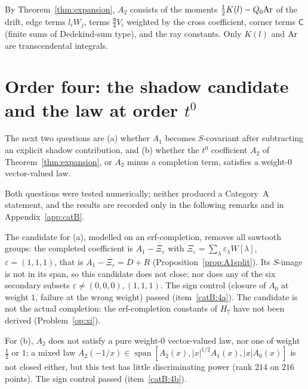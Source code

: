 \begin{remark}[Structure of $A_2$]
By Theorem~\ref{thm:expansion}, $A_2$ consists of the moments $\frac12K(l)-Q_0\mathrm{Ar}$ of the drift, edge terms $l_iW_j$, terms $\frac{\mathsf q}4V_i$ weighted by the
cross coefficient, corner terms $\mathsf C$ (finite sums of Dedekind-sum type), and the ray constants. Only $K(l)$ and $\mathrm{Ar}$ are transcendental integrals.
\end{remark}

\section{Order four: the shadow candidate and the law at order $t^0$}\label{sec:order4}
The next two questions are (a) whether $A_1$ becomes $S$-covariant after subtracting an explicit shadow contribution, and (b) whether the
$t^0$ coefficient $A_2$ of Theorem~\ref{thm:expansion}, or $A_2$ minus a completion term, satisfies a weight-$0$ vector-valued law.

Both questions were tested numerically; neither produced a Category~A statement, and the results are recorded only in the following remarks
and in Appendix~\ref{app:catB}.
\begin{remark}
The candidate for (a), modelled on an erf-completion, removes all sawtooth groups: the completed coefficient is $A_1-\Xi_\varepsilon$ with
$\Xi_\varepsilon=\sum_\lambda\varepsilon_\lambda W[\lambda]$, $\varepsilon=(1,1,1)$, that is $A_1-\Xi_\varepsilon=D+R$ (Proposition~\ref{prop:A1split}).
Its $S$-image is not in its span, so this candidate does not close; nor does any of the six secondary subsets $\varepsilon\ne(0,0,0),(1,1,1)$.
The sign control (closure of $A_0$ at weight $1$, failure at the wrong weight) passed (item~\ref{catB:4a}). The candidate is not the
actual completion: the erf-completion constants of $H_7$ have not been derived (Problem~\ref{op:xi}).
\end{remark}
\begin{remark}
For (b), $A_2$ does not satisfy a pure weight-$0$ vector-valued law, nor one of weight $\frac12$ or $1$; a mixed law
$A_2(-1/x)\in\operatorname{span}[A_2(x),|x|^{1/2}A_1(x),|x|A_0(x)]$ is not closed either, but this test has little discriminating power (rank
$214$ on $216$ points). The sign control passed (item~\ref{catB:4b}).
\end{remark}
